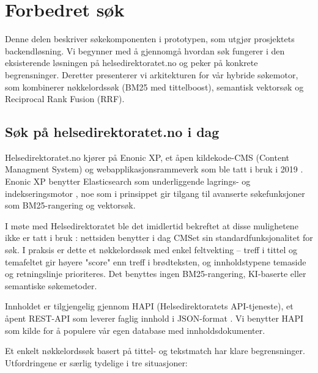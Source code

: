 \section{Forbedret søk}
\label{sec:del2-soek}

Denne delen beskriver søkekomponenten i prototypen, som utgjør prosjektets
backendløsning. Vi begynner med å gjennomgå hvordan søk fungerer i den
eksisterende løsningen på helsedirektoratet.no og peker på konkrete
begrensninger. Deretter presenterer vi arkitekturen for vår hybride søkemotor,
som kombinerer nøkkelordssøk (BM25 med tittelboost), semantisk vektorsøk og
Reciprocal Rank Fusion (RRF).

\subsection{Søk på helsedirektoratet.no i dag}
\label{sec:soek-i-dag}

Helsedirektoratet.no kjører på Enonic XP, et åpen kildekode-CMS (Content Managment System) og
webapplikasjonsrammeverk som ble tatt i bruk i 2019 \cite{enonicCase}.
Enonic XP benytter Elasticsearch som underliggende lagrings- og indekseringsmotor
\cite{enonicArchitecture}, noe som i prinsippet gir tilgang til avanserte
søkefunksjoner som BM25-rangering og vektorsøk.

I møte med Helsedirektoratet ble det imidlertid bekreftet at disse mulighetene
ikke er tatt i bruk \cite{meeting2026helsedir}: nettsiden benytter i dag CMSet
sin standardfunksjonalitet for søk. I praksis er dette et nøkkelordssøk med
enkel feltvekting -- treff i tittel og temafeltet gir høyere "score" enn treff i
brødteksten, og innholdstypene temaside og retningslinje prioriteres.
Det benyttes ingen BM25-rangering, KI-baserte eller semantiske søkemetoder.

Innholdet er tilgjengelig gjennom HAPI (Helsedirektoratets API-tjeneste),
et åpent REST-API som leverer faglig innhold i JSON-format
\cite{helsedirektoratetAPI}. Vi benytter HAPI som kilde for å populere
vår egen database med innholdsdokumenter.

Et enkelt nøkkelordssøk basert på tittel- og tekstmatch har klare begrensninger.
Utfordringene er særlig tydelige i tre situasjoner:

